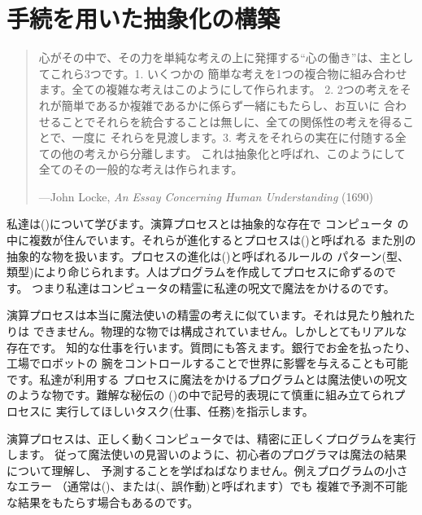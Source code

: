 \chapter{手続を用いた抽象化の構築}
\label{Chapter 1}

\begin{quote}
心がその中で、その力を単純な考えの上に発揮する``心の働き''は、主としてこれら3つです。1. いくつかの
簡単な考えを1つの複合物に組み合わせます。全ての複雑な考えはこのようにして作られます。
2. 2つの考えをそれが簡単であるか複雑であるかに係らず一緒にもたらし、お互いに
合わせることでそれらを統合することは無しに、全ての関係性の考えを得ることで、一度に
それらを見渡します。3. 考えをそれらの実在に付随する全ての他の考えから分離します。
これは抽象化と呼ばれ、このようにして全てのその一般的な考えは作られます。

---John Locke, \emph{An Essay Concerning Human Understanding} (1690)
\end{quote}

\vspace{1.0em}

\noindent
私達は()について学びます。演算プロセスとは抽象的な存在で
コンピュータ
の中に複数が住んでいます。それらが進化するとプロセスは()と呼ばれる
また別の抽象的な物を扱います。プロセスの進化は()と呼ばれるルールの
パターン(型、類型)により命じられます。人はプログラムを作成してプロセスに命ずるのです。
つまり私達はコンピュータの精霊に私達の呪文で魔法をかけるのです。

演算プロセスは本当に魔法使いの精霊の考えに似ています。それは見たり触れたりは
できません。物理的な物では構成されていません。しかしとてもリアルな存在です。
知的な仕事を行います。質問にも答えます。銀行でお金を払ったり、工場でロボットの
腕をコントロールすることで世界に影響を与えることも可能です。私達が利用する
プロセスに魔法をかけるプログラムとは魔法使いの呪文のような物です。難解な秘伝の
()の中で記号的表現にて慎重に組み立てられプロセスに
実行してほしいタスク(仕事、任務)を指示します。



演算プロセスは、正しく動くコンピュータでは、精密に正しくプログラムを実行します。
従って魔法使いの見習いのように、初心者のプログラマは魔法の結果について理解し、
予測することを学ばねばなりません。例えプログラムの小さなエラー
（通常は()、または(、誤作動)と呼ばれます）でも
複雑で予測不可能な結果をもたらす場合もあるのです。



